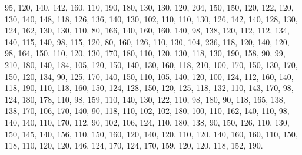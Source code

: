\documentclass[twoside,leqno,11pt]{article}
\begin{document}
         95,
         120,
         140,
         142,
         160,
         110,
         190,
         180,
         130,
         130,
         120,
         204,
         150,
         150,
         120,
         122,
         120,
         130,
         140,
         148,
         118,
         126,
         136,
         140,
         130,
         102,
         110,
         110,
         130,
         126,
         142,
         140,
         128,
         130,
         124,
         162,
         130,
         130,
         110,
         80,
         166,
         140,
         160,
         160,
         140,
         98,
         138,
         120,
         112,
         112,
         134,
         140,
         115,
         140,
         98,
         115,
         120,
         80,
         160,
         126,
         110,
         130,
         104,
         236,
         118,
         120,
         140,
         120,
         98,
         164,
         150,
         110,
         120,
         130,
         170,
         180,
         110,
         120,
         130,
         118,
         130,
         190,
         158,
         90,
         99,
         210,
         180,
         140,
         184,
         105,
         120,
         150,
         140,
         130,
         160,
         118,
         210,
         100,
         170,
         150,
         130,
         170,
         150,
         120,
         134,
         90,
         125,
         170,
         140,
         150,
         110,
         105,
         140,
         120,
         100,
         124,
         112,
         160,
         140,
         118,
         190,
         110,
         118,
         160,
         150,
         124,
         128,
         150,
         120,
         125,
         118,
         132,
         110,
         143,
         170,
         98,
         124,
         180,
         178,
         110,
         98,
         159,
         110,
         140,
         130,
         122,
         110,
         98,
         180,
         90,
         118,
         165,
         138,
         138,
         170,
         106,
         170,
         140,
         90,
         118,
         110,
         102,
         102,
         180,
         100,
         110,
         162,
         140,
         110,
         98,
         140,
         140,
         110,
         170,
         112,
         90,
         102,
         106,
         124,
         110,
         180,
         138,
         90,
         150,
         126,
         110,
         130,
         150,
         145,
         140,
         156,
         110,
         150,
         160,
         120,
         140,
         120,
         110,
         120,
         140,
         160,
         160,
         110,
         150,
         118,
         110,
         120,
         120,
         146,
         124,
         170,
         124,
         170,
         159,
         120,
         120,
         118,
         152,
         190.
\end{document}
